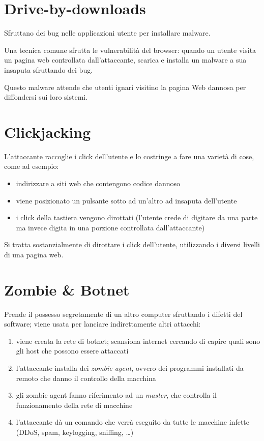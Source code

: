 \section{Drive-by-downloads}
Sfruttano dei bug nelle applicazioni utente per installare malware.

Una tecnica comune sfrutta le vulnerabilità del browser: quando un utente visita un pagina web controllata
dall'attaccante, scarica e installa un malware a sua insaputa sfruttando dei bug.

Questo malware attende che utenti ignari visitino la pagina Web dannosa per diffondersi sui loro
sistemi.

\section{Clickjacking}

L'attaccante raccoglie i click dell'utente e lo costringe a fare una varietà 
di cose, come ad esempio:
\begin{itemize}
    \item indirizzare a siti web che contengono codice dannoso
    \item viene posizionato un pulsante sotto ad un'altro ad insaputa dell'utente
    \item i click della tastiera vengono dirottati (l'utente crede di digitare da una parte ma invece 
    digita in una porzione controllata dall'attaccante)
\end{itemize}

Si tratta sostanzialmente di dirottare i click dell'utente, utilizzando
i diversi livelli di una pagina web.

\section{Zombie \& Botnet}
Prende il possesso segretamente di un altro computer sfruttando i 
difetti del software; viene usata per lanciare indirettamente altri attacchi:
\begin{enumerate}
    \item viene creata la rete di botnet; scansiona internet cercando di capire quali sono gli host che possono essere attaccati
    \item l'attaccante installa dei \textit{zombie agent}, ovvero dei programmi installati da remoto che danno il controllo della macchina
    \item gli zombie agent fanno riferimento ad un \textit{master}, che controlla il funzionamento della rete di macchine
    \item l'attaccante dà un comando che verrà eseguito da tutte le macchine infette (DDoS, spam, keylogging, sniffing, \dots)
\end{enumerate}

